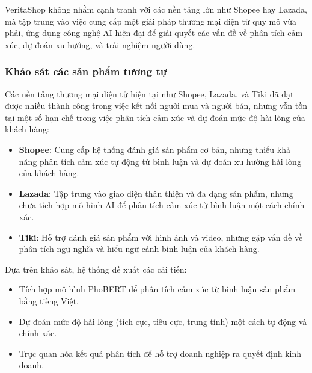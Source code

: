 VeritaShop không nhằm cạnh tranh với các nền tảng lớn như Shopee hay Lazada, mà tập trung vào việc cung cấp một giải pháp thương mại điện tử quy mô vừa phải, ứng dụng công nghệ AI hiện đại để giải quyết các vấn đề về phân tích cảm xúc, dự đoán xu hướng, và trải nghiệm người dùng.

\subsubsection{Khảo sát các sản phẩm tương tự}
Các nền tảng thương mại điện tử hiện tại như Shopee, Lazada, và Tiki đã đạt được nhiều thành công trong việc kết nối người mua và người bán, nhưng vẫn tồn tại một số hạn chế trong việc phân tích cảm xúc và dự đoán mức độ hài lòng của khách hàng:
\begin{itemize}
    \item \textbf{Shopee}: Cung cấp hệ thống đánh giá sản phẩm cơ bản, nhưng thiếu khả năng phân tích cảm xúc tự động từ bình luận và dự đoán xu hướng hài lòng của khách hàng.
    \item \textbf{Lazada}: Tập trung vào giao diện thân thiện và đa dạng sản phẩm, nhưng chưa tích hợp mô hình AI để phân tích cảm xúc từ bình luận một cách chính xác.
    \item \textbf{Tiki}: Hỗ trợ đánh giá sản phẩm với hình ảnh và video, nhưng gặp vấn đề về phân tích ngữ nghĩa và hiểu ngữ cảnh bình luận của khách hàng.
\end{itemize}

Dựa trên khảo sát, hệ thống đề xuất các cải tiến:
\begin{itemize}
    \item Tích hợp mô hình PhoBERT để phân tích cảm xúc từ bình luận sản phẩm bằng tiếng Việt.
    \item Dự đoán mức độ hài lòng (tích cực, tiêu cực, trung tính) một cách tự động và chính xác.
    \item Trực quan hóa kết quả phân tích để hỗ trợ doanh nghiệp ra quyết định kinh doanh.
\end{itemize}

